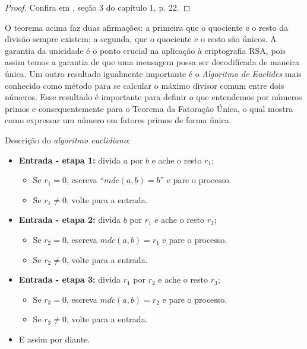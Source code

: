 \begin{proof}
Confira em \cite{cou:2014}, se\c{c}\~ao 3 do cap\'itulo 1, p. 22.
\end{proof}

O teorema acima faz duas afirma\c{c}\~oes: a primeira que o quociente e o resto da divis\~ao sempre existem; a segunda, que o quociente e o resto s\~ao \'unicos. A garantia da unicidade \'e o ponto crucial na aplica\c{c}\~ao \`a criptografia RSA, pois assim temos a garantia de que uma mensagem possa ser decodificada de maneira \'unica. Um outro resultado 
igualmente importante \'e o \textit{Algoritmo de Euclides} mais conhecido como m\'etodo para se calcular o m\'aximo divisor comum entre dois 
n\'umeros. Esse resultado \'e importante para definir o que entendemos por n\'umeros primos e consequentemente para o Teorema da Fatora\c{c}\~ao \'Unica, o qual mostra como expressar um n\'umero em fatores primos de forma \'unica. 

Descri\c{c}\~{a}o do \textit{algoritmo euclidiano}: 

\begin{itemize}
		\item \textbf{Entrada - etapa 1:} divida $a$ por $b$ e ache o resto $r_{1}$;
						\begin{itemize}
								\item Se $r_{1}=0$, escreva ``$mdc(a,b)=b$'' e pare o processo.
								\item Se $r_{1}\neq 0$, volte para a entrada.
						\end{itemize}
		\item \textbf{Entrada - etapa 2:} divida $b$ por $r_{1}$ e ache o resto $r_{2}$;  
						\begin{itemize}
								\item Se $r_{2}=0$, escreva $mdc(a,b)=r_{1}$ e pare o processo.
								\item Se $r_{2}\neq 0$, volte para a entrada.
						\end{itemize}
		\item \textbf{Entrada - etapa 3:} divida $r_{1}$ por $r_{2}$ e ache o resto $r_{3}$;
					\begin{itemize}
								\item Se $r_{3}=0$, escreva $mdc(a,b)=r_{2}$ e pare o processo.
								\item Se $r_{3}\neq 0$, volte para a entrada.
					\end{itemize}
		\item E assim por diante.
\end{itemize}

